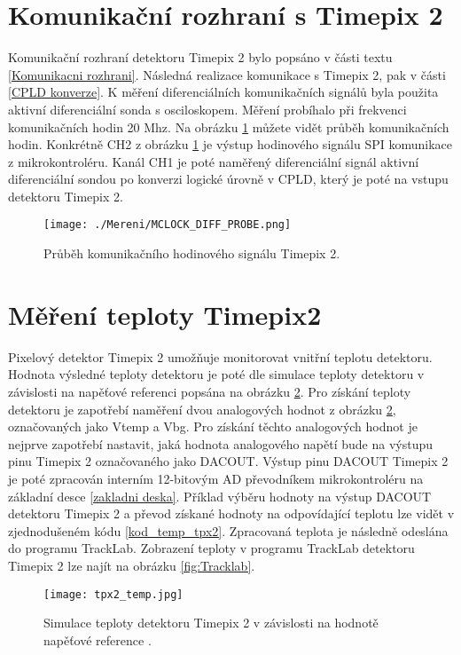 \section{Komunikační rozhraní s Timepix 2}		%
Komunikační rozhraní detektoru Timepix 2 bylo popsáno v části textu \ref{Komunikacni rozhrani}. Následná  realizace komunikace s Timepix 2, pak v části \ref{CPLD konverze}. K měření diferenciálních komunikačních signálů byla použita aktivní diferenciální sonda s osciloskopem. Měření probíhalo při frekvenci komunikačních hodin 20 Mhz. Na obrázku \ref{fig:MCLOCK_DIFF_PROBE} můžete vidět průběh komunikačních hodin. Konkrétně CH2 z obrázku \ref{fig:MCLOCK_DIFF_PROBE} je výstup hodinového signálu SPI komunikace z mikrokontroléru. Kanál CH1 je poté naměřený diferenciální signál aktivní diferenciální sondou po konverzi logické úrovně v CPLD, který je poté na vstupu detektoru Timepix 2.  
\begin{figure}[h!]
	\centering
	\captionsetup{justification=centering}
	\texttt{[image: ./Mereni/MCLOCK\_DIFF\_PROBE.png]}
	\caption{Průběh komunikačního hodinového signálu Timepix 2.} 
	\label{fig:MCLOCK_DIFF_PROBE}
\end{figure}

\section{Měření teploty Timepix2}
\label{teplota}
Pixelový detektor Timepix 2 umožňuje monitorovat vnitřní teplotu detektoru. Hodnota výsledné teploty detektoru je poté dle simulace teploty detektoru v závislosti na napěťové referenci popsána na obrázku \ref{fig:tpx2_temp}. Pro získání teploty detektoru je zapotřebí naměření dvou analogových hodnot z obrázku \ref{fig:tpx2_temp}, označovaných jako Vtemp a Vbg. Pro získání těchto analogových hodnot je nejprve zapotřebí nastavit, jaká hodnota analogového napětí bude na výstupu pinu Timepix 2 označovaného jako DACOUT. Výstup pinu DACOUT Timepix 2 je poté zpracován interním 12-bitovým AD převodníkem mikrokontroléru na základní desce \ref{zakladni deska}. Příklad výběru hodnoty na výstup DACOUT detektoru Timepix 2 a převod získané hodnoty na odpovídající teplotu lze vidět v zjednodušeném kódu \ref{kod_temp_tpx2}. Zpracovaná teplota je následně odeslána do programu TrackLab. Zobrazení teploty v programu TrackLab detektoru Timepix 2 lze najít na obrázku \ref{fig:Tracklab}.  
\begin{figure}[h!]
	\centering
	\captionsetup{justification=centering}
	\texttt{[image: tpx2\_temp.jpg]}
	\caption{Simulace teploty detektoru Timepix 2 v závislosti na hodnotě napěťové reference \cite{tpx2_manual}.} 
	\label{fig:tpx2_temp}
\end{figure}

